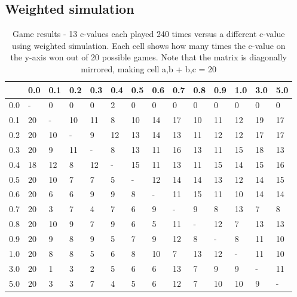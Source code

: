 \documentclass[
11pt, %
english, %
singlespacing, %
headsepline, %
]{MastersDoctoralThesis} %
\begin{document}
\begin{appendices}
\subsection{Weighted simulation}
\begin{table}[H]	
	\centering
	\begin{tabular}{|l||l|l|l|l|l|l|l|l|l|l|l|l|l|}
		\hline
		& 0.0 & 0.1 & 0.2 & 0.3 & 0.4 & 0.5 & 0.6 & 0.7 & 0.8 & 0.9 & 1.0 & 3.0 & 5.0 \\ \hline
		\hline
		0.0 & -   & 0   & 0   & 0   & 2   & 0   & 0   & 0   & 0   & 0   & 0   & 0   & 0   \\ \hline
		0.1 & 20  & -   & 10  & 11  & 8   & 10  & 14  & 17  & 10  & 11  & 12  & 19  & 17  \\ \hline
		0.2 & 20  & 10  & -   & 9   & 12  & 13  & 14  & 13  & 11  & 12  & 12  & 17  & 17  \\ \hline
		0.3 & 20  & 9   & 11  & -   & 8   & 13  & 11  & 16  & 13  & 11  & 15  & 18  & 13  \\ \hline
		0.4 & 18  & 12  & 8   & 12  & -   & 15  & 11  & 13  & 11  & 15  & 14  & 15  & 16  \\ \hline
		0.5 & 20  & 10  & 7   & 7   & 5   & -   & 12  & 14  & 14  & 13  & 12  & 14  & 15  \\ \hline
		0.6 & 20  & 6   & 6   & 9   & 9   & 8   & -   & 11  & 15  & 11  & 10  & 14  & 14  \\ \hline
		0.7 & 20  & 3   & 7   & 4   & 7   & 6   & 9   & -   & 9   & 8   & 13  & 7   & 8   \\ \hline
		0.8 & 20  & 10  & 9   & 7   & 9   & 6   & 5   & 11  & -   & 12  & 7   & 13  & 13  \\ \hline
		0.9 & 20  & 9   & 8   & 9   & 5   & 7   & 9   & 12  & 8   & -   & 8   & 11  & 10  \\ \hline
		1.0 & 20  & 8   & 8   & 5   & 6   & 8   & 10  & 7   & 13  & 12  & -   & 11  & 10  \\ \hline
		3.0 & 20  & 1   & 3   & 2   & 5   & 6   & 6   & 13  & 7   & 9   & 9   & -   & 11  \\ \hline
		5.0 & 20  & 3   & 3   & 7   & 4   & 5   & 6   & 12  & 7   & 10  & 10  & 9   & -   \\ \hline
	\end{tabular}
	\caption{Game results - 13 c-values each played 240 times versus a different c-value using weighted simulation. Each cell shows how many times the c-value on the y-axis won out of 20 possible games. Note that the matrix is diagonally mirrored, making cell a,b + b,c = 20}
	\label{table:ranking-matrix-weighted}
\end{table}


\end{appendices}
\end{document}
